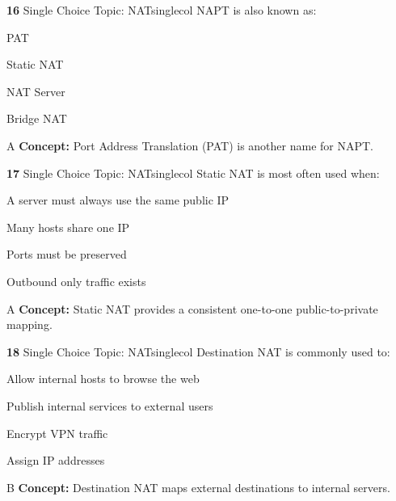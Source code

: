 \documentclass[10pt,a4paper]{article}
\begin{document}
\begin{qcard}{\color{white}\textbf{16} \hfill \small Single Choice \textbar{} Topic: NAT}{singlecol}
NAPT is also known as:

\begin{qoptions}
\item PAT
\item Static NAT
\item NAT Server
\item Bridge NAT
\end{qoptions}
\begin{explainbox}{A}
\textbf{Concept:} Port Address Translation (PAT) is another name for NAPT.
\end{explainbox}
\end{qcard}

\begin{qcard}{\color{white}\textbf{17} \hfill \small Single Choice \textbar{} Topic: NAT}{singlecol}
Static NAT is most often used when:

\begin{qoptions}
\item A server must always use the same public IP
\item Many hosts share one IP
\item Ports must be preserved
\item Outbound only traffic exists
\end{qoptions}
\begin{explainbox}{A}
\textbf{Concept:} Static NAT provides a consistent one-to-one public-to-private mapping.
\end{explainbox}
\end{qcard}

\begin{qcard}{\color{white}\textbf{18} \hfill \small Single Choice \textbar{} Topic: NAT}{singlecol}
Destination NAT is commonly used to:

\begin{qoptions}
\item Allow internal hosts to browse the web
\item Publish internal services to external users
\item Encrypt VPN traffic
\item Assign IP addresses
\end{qoptions}
\begin{explainbox}{B}
\textbf{Concept:} Destination NAT maps external destinations to internal servers.
\end{explainbox}
\end{qcard}
\end{document}
